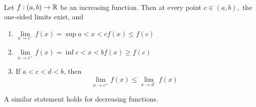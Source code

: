 \begin{theorem} \leavevmode \\
    \label{thm4.29}
    Let $f:(a,b) \to \mathbb{R}$ be an increasing function. Then at every point $c \in (a,b),$ the one-sided limits exist, and 
    \begin{enumerate} [$(i)$]
        \item $\lim \limits_{x \to c^-}f(x) = \sup \limits{a < x < c}f(x) \leq f(c)$
        \item $\lim \limits_{x \to c^+}f(x) = \inf \limits{c < x < b}f(x) \geq f(c)$
        \item If $a < c < d < b$, then 
        $$\lim \limits_{x \to c^+}f(x) \leq \lim \limits_{x \to d^-}f(x)$$
    \end{enumerate}
    A similar statement holds for decreasing functions.
\end{theorem}

